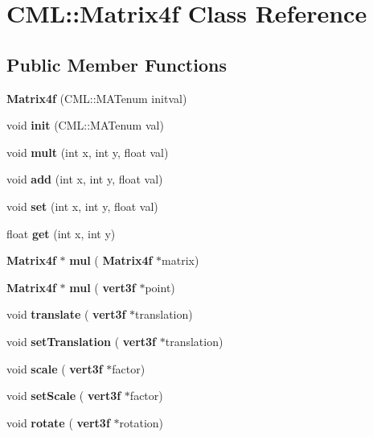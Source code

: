 \section{C\+ML\+:\+:Matrix4f Class Reference}
\label{class_c_m_l_1_1_matrix4f}
\subsection*{Public Member Functions}
\begin{DoxyCompactItemize}
\item 
\mbox{\label{class_c_m_l_1_1_matrix4f_a8a8edc0833663df0e511f9b403e3f984}} 
{\bfseries Matrix4f} (C\+M\+L\+::\+M\+A\+Tenum initval)
\item 
\mbox{\label{class_c_m_l_1_1_matrix4f_a8c1ef358362c3044477b10291bcdb449}} 
void {\bfseries init} (C\+M\+L\+::\+M\+A\+Tenum val)
\item 
\mbox{\label{class_c_m_l_1_1_matrix4f_a74a7e56d8aae01de523834fc0a8e112c}} 
void {\bfseries mult} (int x, int y, float val)
\item 
\mbox{\label{class_c_m_l_1_1_matrix4f_ac9d5835274238730091130624ceb143a}} 
void {\bfseries add} (int x, int y, float val)
\item 
\mbox{\label{class_c_m_l_1_1_matrix4f_a68f93524bf55adad4186bbc09aeef667}} 
void {\bfseries set} (int x, int y, float val)
\item 
\mbox{\label{class_c_m_l_1_1_matrix4f_a099396bdc0211f5d56bb973216fe1075}} 
float {\bfseries get} (int x, int y)
\item 
\mbox{\label{class_c_m_l_1_1_matrix4f_a0286bf22e9b57247c542dc5294da056d}} 
\textbf{ Matrix4f} $\ast$ {\bfseries mul} (\textbf{ Matrix4f} $\ast$matrix)
\item 
\mbox{\label{class_c_m_l_1_1_matrix4f_afeeb1d6b687e8606e1a4c08987e69a50}} 
\textbf{ Matrix4f} $\ast$ {\bfseries mul} (\textbf{ vert3f} $\ast$point)
\item 
\mbox{\label{class_c_m_l_1_1_matrix4f_ac00e39d778ac6abf6140343daf218020}} 
void {\bfseries translate} (\textbf{ vert3f} $\ast$translation)
\item 
\mbox{\label{class_c_m_l_1_1_matrix4f_a689ee4e6b4b859ae4c2ecefd98ed29f0}} 
void {\bfseries set\+Translation} (\textbf{ vert3f} $\ast$translation)
\item 
\mbox{\label{class_c_m_l_1_1_matrix4f_af3d13b6a4538aefe899325b85d14568b}} 
void {\bfseries scale} (\textbf{ vert3f} $\ast$factor)
\item 
\mbox{\label{class_c_m_l_1_1_matrix4f_ae38851b142f313be9e2d6e4f5edf2f00}} 
void {\bfseries set\+Scale} (\textbf{ vert3f} $\ast$factor)
\item 
\mbox{\label{class_c_m_l_1_1_matrix4f_a687645d4ca6ecf17a7bd55e8812cfadf}} 
void {\bfseries rotate} (\textbf{ vert3f} $\ast$rotation)
\end{DoxyCompactItemize}

